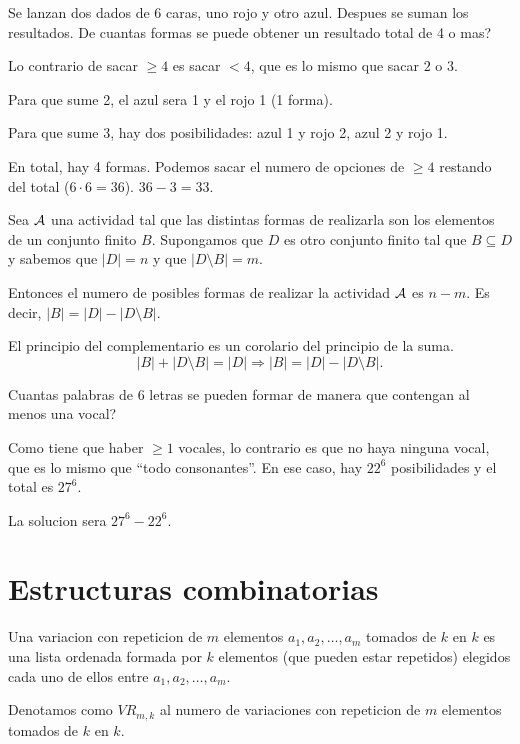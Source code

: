 \begin{example}
	Se lanzan dos dados de 6 caras, uno rojo y otro azul. Despues se suman los resultados. De cuantas formas se puede obtener un resultado total de 4 o mas?

	Lo contrario de sacar \(\geq  4 \) es sacar \(< 4 \), que es lo mismo que sacar \(2 \) o \(3 \).

	Para que sume 2, el azul sera 1 y el rojo 1 (1 forma).

	Para que sume 3, hay dos posibilidades: azul 1 y rojo 2, azul 2 y rojo 1.

	En total, hay 4 formas. Podemos sacar el numero de opciones de \(\geq  4 \) restando del total (\(6 \cdot 6 = 36\)). \(36 - 3 = 33 \).
\end{example}

\begin{proposition}
	Sea \(\mathcal{\MakeUppercase{a}} \) una actividad tal que las distintas formas de realizarla son los elementos de un conjunto finito \(B\). Supongamos que \(D \) es otro conjunto finito tal que \(B \subseteq D \) y sabemos que \(|D| = n \) y que \(|D \setminus B| = m\).

	Entonces el numero de posibles formas de realizar la actividad \(\mathcal{\MakeUppercase{a}} \) es \(n - m \). Es decir, \(|B| = |D| - |D \setminus B| \).
\end{proposition}
\begin{remark}
	El principio del complementario es un corolario del principio de la suma.
	\[
		|B| + |D \setminus B| = |D| \Rightarrow |B| = |D| - |D \setminus B|.
	\]
\end{remark}

\begin{example}
	Cuantas palabras de 6 letras se pueden formar de manera que contengan al menos una vocal?

	Como tiene que haber \(\geq  1 \) vocales, lo contrario es que no haya ninguna vocal, que es lo mismo que ``todo consonantes''. En ese caso, hay \(22^{6}\) posibilidades y el total es \(27^{6} \).

	La solucion sera \(27^{6} - 22^{6} \).
\end{example}

\section{Estructuras combinatorias}
\begin{definition}
	Una variacion con repeticion de \(m \) elementos \(a_1, a_2, \ldots, a_{m }\) tomados de \(k \) en \(k \) es una lista ordenada formada por \(k \) elementos (que pueden estar repetidos) elegidos cada uno de ellos entre \(a_1, a_2, \ldots, a_m \).

	Denotamos como \(VR_{m,k}\) al numero de variaciones con repeticion de \(m \) elementos tomados de \(k \) en \(k \).
\end{definition}

